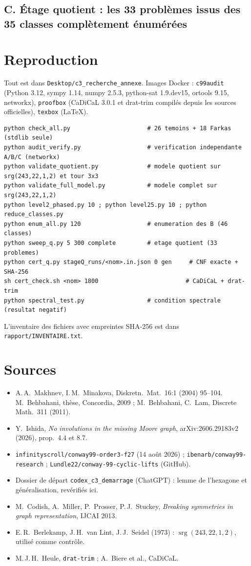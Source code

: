 \documentclass[11pt,a4paper]{article}
\theoremstyle{remark}
\newcommand{\srg}{\operatorname{srg}}
\newcommand{\code}[1]{\texttt{#1}}
\begin{document}
\subsection*{C. Étage quotient : les 33 problèmes issus des 35 classes complètement énumérées}\label{sec:tabC}
{\small}

\section{Reproduction}
Tout est dans \code{Desktop/c3\_recherche\_annexe}. Images Docker : \code{c99audit} (Python 3.12, sympy 1.14, numpy 2.5.3, python-sat 1.9.dev15,
ortools 9.15, networkx), \code{proofbox} (CaDiCaL 3.0.1 et drat-trim compilés depuis les sources officielles), \code{texbox} (LaTeX).
{\small\begin{verbatim}
python check_all.py                      # 26 temoins + 18 Farkas (stdlib seule)
python audit_verify.py                   # verification independante A/B/C (networkx)
python validate_quotient.py              # modele quotient sur srg(243,22,1,2) et tour 3x3
python validate_full_model.py            # modele complet sur srg(243,22,1,2)
python level2_phased.py 10 ; python level25.py 10 ; python reduce_classes.py
python enum_all.py 120                   # enumeration des B (46 classes)
python sweep_q.py 5 300 complete         # etage quotient (33 problemes)
python cert_q.py stageQ_runs/<nom>.in.json 0 gen     # CNF exacte + SHA-256
sh cert_check.sh <nom> 1800                         # CaDiCaL + drat-trim
python spectral_test.py                  # condition spectrale (resultat negatif)
\end{verbatim}}
L'inventaire des fichiers avec empreintes SHA-256 est dans \code{rapport/INVENTAIRE.txt}.

\section{Sources}
\begin{sloppypar}
\begin{itemize}[nosep]
\item A.\,A.~Makhnev, I.\,M.~Minakova, Diskretn.\ Mat.\ 16:1 (2004) 95--104. M.~Behbahani, thèse, Concordia, 2009 ; M.~Behbahani, C.~Lam, Discrete Math.\ 311 (2011).
\item Y.~Ishida, \emph{No involutions in the missing Moore graph}, arXiv:2606.29183v2 (2026), prop.~4.4 et 8.7.
\item \code{infinityscroll/conway99-order3-f27} (14 août 2026) ; \code{ibenarb/conway99-research} ; \code{Lundle22/conway-99-cyclic-lifts} (GitHub).
\item Dossier de départ \code{codex\_c3\_demarrage} (ChatGPT) : lemme de l'hexagone et généralisation, revérifiés ici.
\item M.~Codish, A.~Miller, P.~Prosser, P.\,J.~Stuckey, \emph{Breaking symmetries in graph representation}, IJCAI 2013.
\item E.\,R.~Berlekamp, J.\,H.~van Lint, J.\,J.~Seidel (1973) : $\srg(243,22,1,2)$, utilisé comme contrôle.
\item M.\,J.\,H.~Heule, \code{drat-trim} ; A.~Biere et al., CaDiCaL.
\end{itemize}
\end{sloppypar}
\end{document}

